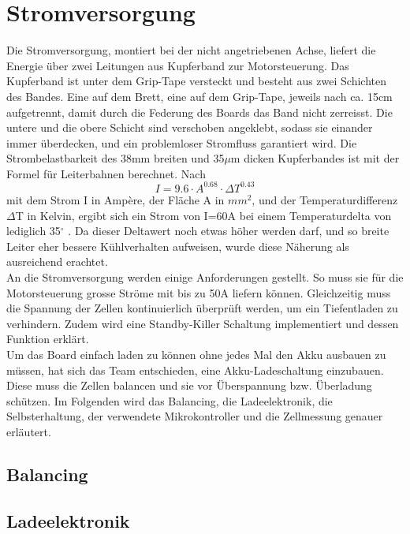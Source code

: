 \section{Stromversorgung}
\label{HW_Stromversorgung}
Die Stromversorgung, montiert bei der nicht angetriebenen Achse, liefert die Energie über zwei Leitungen aus Kupferband zur Motorsteuerung. Das Kupferband ist unter dem Grip-Tape versteckt und besteht aus zwei Schichten des Bandes. Eine auf dem Brett, eine auf dem Grip-Tape, jeweils nach ca. 15cm aufgetrennt, damit durch die Federung des Boards das Band nicht zerreisst. Die untere und die obere Schicht sind verschoben angeklebt, sodass sie einander immer überdecken, und ein problemloser Stromfluss garantiert wird. Die Strombelastbarkeit des 38mm breiten und 35$\mu$m dicken Kupferbandes ist mit der Formel für Leiterbahnen berechnet.
Nach
\begin{equation}\label{FormelStrombelastbarkeit}
I = 9.6 \cdot A^{0.68} \cdot \Delta T ^{0.43}
\end{equation}
mit dem Strom I in Ampère, der Fläche A in \(mm^2\), und der Temperaturdifferenz \(\Delta\)T in Kelvin,
ergibt sich ein Strom von I=60A bei einem Temperaturdelta von lediglich 35\(^\circ\) \cite{FormelStrombelastbarkeitLeiterbahn}. Da dieser Deltawert noch etwas höher werden darf, und so breite Leiter eher bessere Kühlverhalten aufweisen, wurde diese Näherung als ausreichend erachtet.
\\
An die Stromversorgung werden einige Anforderungen gestellt. So muss sie für die Motorsteuerung grosse Ströme mit bis zu 50A liefern können. Gleichzeitig muss die Spannung der Zellen kontinuierlich überprüft werden, um ein Tiefentladen zu verhindern. Zudem wird eine Standby-Killer Schaltung implementiert und dessen Funktion erklärt.\\
Um das Board einfach laden zu können ohne jedes Mal den Akku ausbauen zu müssen, hat sich das Team entschieden, eine Akku-Ladeschaltung einzubauen. Diese muss die Zellen balancen und sie vor Überspannung bzw. Überladung schützen. 
Im Folgenden wird das Balancing, die Ladeelektronik, die Selbsterhaltung, der verwendete Mikrokontroller und die Zellmessung genauer erläutert.
\subsection*{Balancing}


\subsection*{Ladeelektronik}


